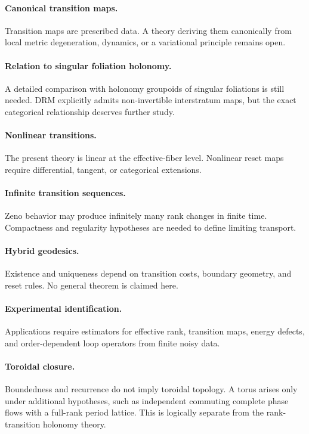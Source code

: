 \documentclass[11pt]{article}
\begin{document}
\paragraph{Canonical transition maps.}
Transition maps are prescribed data. A theory deriving them canonically from
local metric degeneration, dynamics, or a variational principle remains open.

\paragraph{Relation to singular foliation holonomy.}
A detailed comparison with holonomy groupoids of singular foliations is still
needed. DRM explicitly admits non-invertible interstratum maps, but the exact
categorical relationship deserves further study.

\paragraph{Nonlinear transitions.}
The present theory is linear at the effective-fiber level. Nonlinear reset
maps require differential, tangent, or categorical extensions.

\paragraph{Infinite transition sequences.}
Zeno behavior may produce infinitely many rank changes in finite time.
Compactness and regularity hypotheses are needed to define limiting transport.

\paragraph{Hybrid geodesics.}
Existence and uniqueness depend on transition costs, boundary geometry, and
reset rules. No general theorem is claimed here.

\paragraph{Experimental identification.}
Applications require estimators for effective rank, transition maps, energy
defects, and order-dependent loop operators from finite noisy data.

\paragraph{Toroidal closure.}
Boundedness and recurrence do not imply toroidal topology. A torus arises only
under additional hypotheses, such as independent commuting complete phase
flows with a full-rank period lattice. This is logically separate from the
rank-transition holonomy theory.
\end{document}
